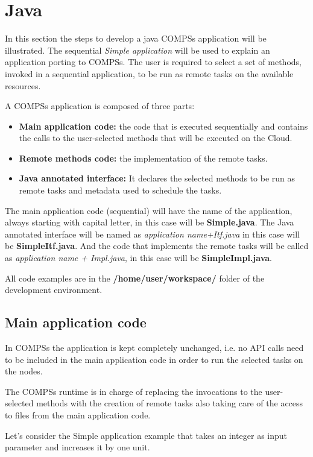 \section{Java}
\label{sec:Java}

In this section the steps to develop a java COMPSs application will be illustrated. The sequential \textit{Simple application}
will be used to explain an application porting to COMPSs. The user is required to select a set of
methods, invoked in a sequential application, to be run as remote tasks on the available resources.

A COMPSs application is composed of three parts:
\begin{itemize}
 \item {\bf Main application code:} the code that is executed sequentially and contains the calls to the user-selected methods that will be executed on the Cloud.
 \item {\bf Remote methods code:} the implementation of the remote tasks.
 \item {\bf Java annotated interface:} It declares the selected methods to be run as remote tasks and metadata used to schedule the tasks.
\end{itemize}

The main application code (sequential) will have the name of the application, always starting with capital
letter, in this case will be {\bf Simple.java}. The Java annotated interface will be named as {\it application name+Itf.java} 
in this case will be {\bf SimpleItf.java}. And the code that implements the remote tasks will be called as
{\it application name + Impl.java}, in this case will be {\bf SimpleImpl.java}.

All code examples are in the {\bf /home/user/workspace/} folder of the development environment.

\subsection{Main application code}

In COMPSs the application is kept completely unchanged, i.e. no API calls need to be included in the main
application code in order to run the selected tasks on the nodes.

The COMPSs runtime is in charge of replacing the invocations to the user-selected methods with the
creation of remote tasks also taking care of the access to files from the main application code.

Let’s consider the Simple application example that takes an integer as input parameter and increases it by one unit.

